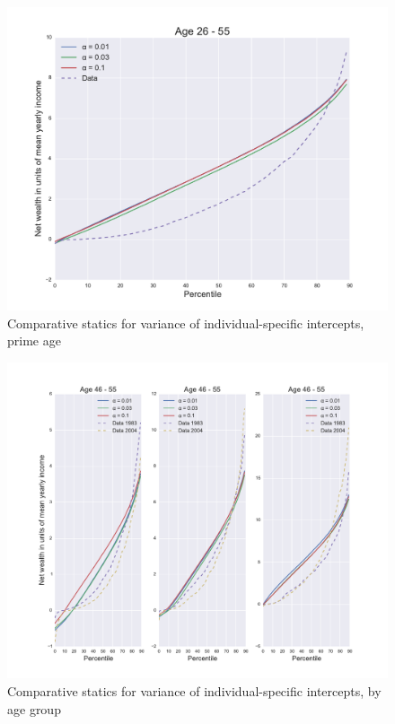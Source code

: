 \begin{figure}
\includegraphics[width=\columnwidth]{comp_stat_alpha}
\caption{Comparative statics for variance of individual-specific intercepts, prime age}
\label{fig:comp_stat_alpha}
\end{figure}

\begin{figure}
\includegraphics[width=\columnwidth]{comp_stat_alpha_agedetail}
\caption{Comparative statics for variance of individual-specific intercepts, by age group}
\label{fig:comp_stat_alpha_agedetail}
\end{figure}

